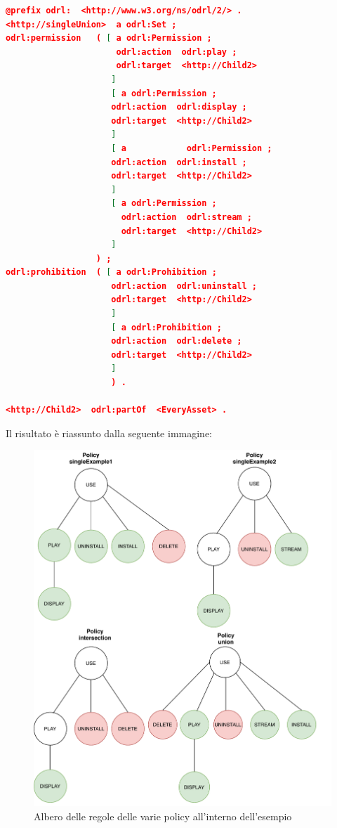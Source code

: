 \documentclass[12pt,a4paper,twoside]{book}
\begin{document}
\begin{lstlisting}[language=json,firstnumber=1,caption={Risultato dell'unione delle policy nei listing \ref{mergingOnSingle1} e \ref{mergingOnSingle2}},captionpos=b,label=unionSingle]
@prefix odrl:  <http://www.w3.org/ns/odrl/2/> .
<http://singleUnion>  a odrl:Set ;
odrl:permission   ( [ a odrl:Permission ;
                      odrl:action  odrl:play ;
                      odrl:target  <http://Child2>
                     ]
                     [ a odrl:Permission ;
                     odrl:action  odrl:display ;
                     odrl:target  <http://Child2>
                     ]
                     [ a            odrl:Permission ;
                     odrl:action  odrl:install ;
                     odrl:target  <http://Child2>
                     ]
                     [ a odrl:Permission ;
                       odrl:action  odrl:stream ;
                       odrl:target  <http://Child2>
                     ]
                  ) ;
odrl:prohibition  ( [ a odrl:Prohibition ;
                     odrl:action  odrl:uninstall ;
                     odrl:target  <http://Child2>
                     ]
                     [ a odrl:Prohibition ;
                     odrl:action  odrl:delete ;
                     odrl:target  <http://Child2>
                     ]
                     ) .

<http://Child2>  odrl:partOf  <EveryAsset> .

\end{lstlisting}
Il risultato è riassunto dalla seguente immagine:
\begin{figure}[H]
\centering
\includegraphics[scale=.50]{../immagini/singlePolicyExample.pdf}
\caption{Albero delle regole delle varie policy all'interno dell'esempio}
\label{singleResult}
\end{figure}
\end{document}
